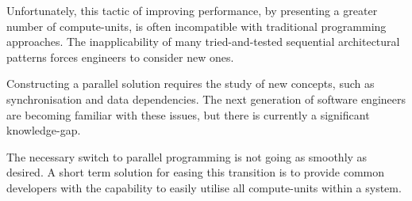Unfortunately, this tactic of improving performance, by presenting a greater number of compute-units, is often incompatible with traditional programming approaches. The inapplicability of many tried-and-tested sequential architectural patterns forces engineers to consider new ones.

Constructing a parallel solution requires the study of new concepts, such as synchronisation and data dependencies. The next generation of software engineers are becoming familiar with these issues, but there is currently a significant knowledge-gap.

The necessary switch to parallel programming is not going as smoothly as desired. A short term solution for easing this transition is to provide common developers with the capability to easily utilise all compute-units within a system.
